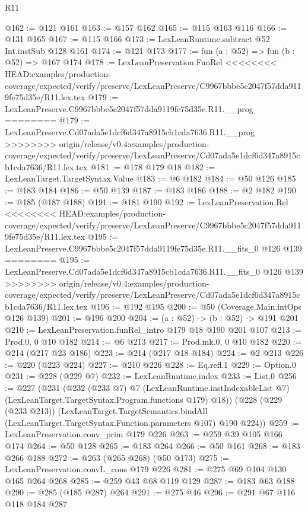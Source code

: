 \begin{lexlean}{R11}
\begin{coremodule}
{{{{{@162 := @121 @161
@163 := @157 @162
@165 := @115 @163 @116
@166 := @131 @165
@167 := @115 @166
@173 := LexLeanRuntime.subtract @52 Int.instSub @128 @161
@174 := @121 @173
@177 := fun (a : @52) => fun (b : @52) => @167 @174
@178 := LexLeanPreservation.FunRel
<<<<<<<< HEAD:examples/production-coverage/expected/verify/preserve/LexLeanPreserve/C9967bbbe5c2047f57dda9119fe75d35e/R11.lex.tex
@179 := LexLeanPreserve.C9967bbbe5c2047f57dda9119fe75d35e.R11.__prog
========
@179 := LexLeanPreserve.Cd07ada5e1dcf6d347a8915cb1cda7636.R11.__prog
>>>>>>>> origin/release/v0.4:examples/production-coverage/expected/verify/preserve/LexLeanPreserve/Cd07ada5e1dcf6d347a8915cb1cda7636/R11.lex.tex
@181 := @178 @179 @18
@182 := LexLeanTarget.TargetSyntax.Value
@183 := @6 @182
@184 := @50 @126
@185 := @183 @184
@186 := @50 @139
@187 := @183 @186
@188 := @2 @182
@190 := @185 (@187 @188)
@191 := @181 @190
@192 := LexLeanPreservation.Rel
<<<<<<<< HEAD:examples/production-coverage/expected/verify/preserve/LexLeanPreserve/C9967bbbe5c2047f57dda9119fe75d35e/R11.lex.tex
@195 := LexLeanPreserve.C9967bbbe5c2047f57dda9119fe75d35e.R11.__fits_0 @126 @139
========
@195 := LexLeanPreserve.Cd07ada5e1dcf6d347a8915cb1cda7636.R11.__fits_0 @126 @139
>>>>>>>> origin/release/v0.4:examples/production-coverage/expected/verify/preserve/LexLeanPreserve/Cd07ada5e1dcf6d347a8915cb1cda7636/R11.lex.tex
@196 := @192 @195
@200 := @50 (Coverage.Main.intOps @126 @139)
@201 := @196 @200
@204 := (a : @52) -> (b : @52) -> @191 @201
@210 := LexLeanPreservation.funRel_intro @179 @18 @190 @201 @107
@213 := Prod.{0, 0} @10 @182
@214 := @6 @213
@217 := Prod.mk.{0, 0} @10 @182
@220 := @214 (@217 @23 @186)
@223 := @214 (@217 @18 @184)
@224 := @2 @213
@226 := @220 (@223 @224)
@227 := @210 @226
@228 := Eq.refl.{1}
@229 := Option.{0}
@231 := @228 (@229 @7)
@232 := LexLeanRuntime.index
@233 := List.{0}
@256 := @227
    (@231
      (@232
        (@233 @7)
        @7
        (LexLeanRuntime.instIndexableList @7)
        (LexLeanTarget.TargetSyntax.Program.functions @179)
        @18))
    (@228
      (@229 (@233 @213))
      (LexLeanTarget.TargetSemantics.bindAll
        (LexLeanTarget.TargetSyntax.Function.parameters @107)
        @190
        @224))
@259 := LexLeanPreservation.conv_prim @179 @226
@263 := @259 @39 @105 @166 @174
@264 := @50 @128
@265 := @183 @264
@266 := @50 @161
@268 := @183 @266 @188
@272 := @263 (@265 @268) (@50 @173)
@275 := LexLeanPreservation.convL_cons @179 @226
@281 := @275 @69 @104 @130 @165 @264 @268
@285 := @259 @43 @68 @119 @129
@287 := @183 @63 @188
@290 := @285 (@185 @287) @264
@291 := @275 @46
@296 := @291 @67 @116 @118 @184 @287
}}}}}
\end{coremodule}
\end{lexlean}
